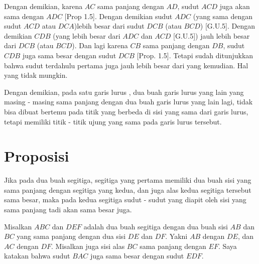 \documentclass[a4paper]{book}
\begin{document}
Dengan demikian, karena $AC$ sama panjang dengan $AD$, sudut $ACD$ 
juga akan sama dengan $ADC$ [Prop 1.5]. Dengan demikian sudut $ADC$ 
(yang sama dengan sudut $ACD$ atau $DCA$)lebih 
besar dari sudut $DCB$ (atau $BCD$) 
[G.U.5]. Dengan demikian $CDB$ (yang lebih besar dari $ADC$ dan $ACD$ [G.U.5]) 
jauh lebih besar dari $DCB$ (atau $BCD$).
Dan lagi karena $CB$ sama panjang dengan $DB$, sudut $CDB$ juga sama besar
dengan sudut $DCB$ [Prop. 1.5]. Tetapi sudah ditunjukkan bahwa sudut terdahulu 
pertama juga jauh lebih besar dari yang kemudian. Hal yang tidak mungkin.

Dengan demikian, pada satu garis lurus , dua buah garis lurus yang lain yang masing - masing 
sama panjang dengan dua buah garis lurus yang lain lagi, tidak bisa dibuat 
bertemu pada titik yang berbeda di sisi yang sama dari garis lurus, tetapi
memiliki titik - titik ujung yang sama pada garis lurus tersebut.

\section*{\centering Proposisi \thesection} 
Jika pada dua buah segitiga,  segitiga yang pertama memiliki dua buah sisi 
yang sama panjang dengan segitiga yang kedua, dan juga alas kedua segitiga 
tersebut sama besar, maka pada kedua segitiga sudut - sudut 
yang diapit oleh sisi yang sama panjang tadi akan sama besar juga.

\begin{center}
\end{center}

Misalkan $ABC$ dan $DEF$ adalah dua buah segitiga dengan dua buah sisi 
$AB$ dan $BC$ yang sama panjang dengan dua sisi $DE$ dan $DF$. Yakni
$AB$ dengan $DE$, dan $AC$ dengan $DF$. Misalkan juga sisi alas $BC$ sama
panjang dengan $EF$. Saya katakan bahwa sudut $BAC$ juga sama besar dengan 
sudut $EDF$.
\end{document}
